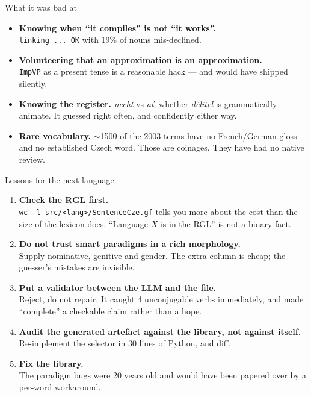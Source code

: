 \documentclass[10pt,aspectratio=169]{beamer}
\begin{document}
\begin{frame}{What it was bad at}
  \begin{itemize}
    \item \textbf{Knowing when ``it compiles'' is not ``it works''.} \\
          \texttt{linking ... OK} with 19\% of nouns mis-declined.
    \item \textbf{Volunteering that an approximation is an approximation.} \\
          \texttt{ImpVP} as a present tense is a reasonable hack --- and would have
          shipped silently.
    \item \textbf{Knowing the register.} \emph{nechť} vs \emph{ať}; whether
          \emph{dělitel} is grammatically animate. It guessed right often, and
          confidently either way.
    \item \textbf{Rare vocabulary.} $\sim$1500 of the 2003 terms have no
          French/German gloss and no established Czech word. Those are coinages.
          \alert{They have had no native review.}
  \end{itemize}
\end{frame}

\begin{frame}{Lessons for the next language}
  \begin{enumerate}
    \item \textbf{Check the RGL first.} \\
          \small \texttt{wc -l src/<lang>/SentenceCze.gf} tells you more about the cost
          than the size of the lexicon does. ``Language $X$ is in the RGL'' is not a
          binary fact.
    \item \normalsize \textbf{Do not trust smart paradigms in a rich morphology.} \\
          \small Supply nominative, genitive and gender. The extra column is cheap;
          the guesser's mistakes are invisible.
    \item \normalsize \textbf{Put a validator between the LLM and the file.} \\
          \small Reject, do not repair. It caught 4 unconjugable verbs immediately,
          and made ``complete'' a checkable claim rather than a hope.
    \item \normalsize \textbf{Audit the generated artefact against the library,
          not against itself.} \\
          \small Re-implement the selector in 30 lines of Python, and diff.
    \item \normalsize \textbf{Fix the library.} \\
          \small The paradigm bugs were 20 years old and would have been papered over
          by a per-word workaround.
  \end{enumerate}
\end{frame}
\end{document}
